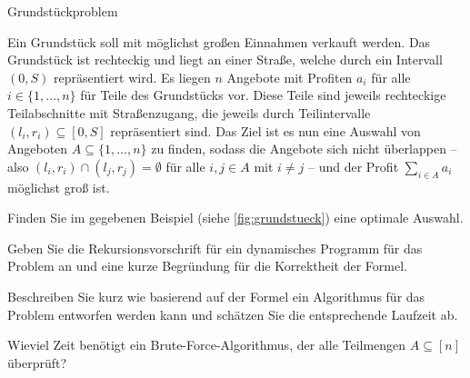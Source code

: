 \documentclass{article}
\begin{document}
\begin{eexercises}{Grundstückproblem}{
    Ein Grundstück soll mit möglichst großen Einnahmen verkauft werden. Das Grundstück ist rechteckig und liegt an einer Straße, welche durch ein Intervall $(0, S)$ repräsentiert wird. Es liegen $n$ Angebote mit Profiten $a_i$ für alle $i \in \{1, \ldots, n\}$ für Teile des Grundstücks vor. Diese Teile sind jeweils rechteckige Teilabschnitte mit Straßenzugang, die jeweils durch Teilintervalle $(l_i, r_i) \subseteq [0, S]$ repräsentiert sind. Das Ziel ist es nun eine Auswahl von Angeboten $A \subseteq \{1, \ldots, n\}$ zu finden, sodass die Angebote sich nicht überlappen – also $(l_i, r_i) \cap (l_j, r_j)=\emptyset$ für alle $i,j \in A$ mit $i \neq j$ – und der Profit $\sum_{i \in A} a_i$ möglichst groß ist.
    
  }
  \item Finden Sie im gegebenen Beispiel (siehe \ref{fig:grundstueck}) eine optimale Auswahl.
  \item Geben Sie die Rekursionsvorschrift für ein dynamisches Programm für das Problem an und eine kurze Begründung für die Korrektheit der Formel.
  \item Beschreiben Sie kurz wie basierend auf der Formel ein Algorithmus für das Problem entworfen werden kann und schätzen Sie die entsprechende Laufzeit ab.
  \item Wieviel Zeit benötigt ein Brute-Force-Algorithmus, der alle Teilmengen $A \subseteq [n]$ überprüft?
\end{eexercises}
\end{document}
